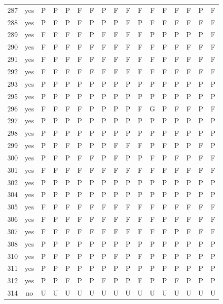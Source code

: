\begin{table}[p]
\begin{tabular*}{\textwidth}{@{\extracolsep{\fill}}rcccccccccccccccc}
287 & yes & P & P & P & F & F & P & F & F & F & F & F & F & F & P & F\\
288 & yes & P & F & P & F & P & P & P & F & P & F & F & F & F & F & F\\
289 & yes & F & F & F & F & P & F & F & F & F & P & P & P & P & P & F\\
290 & yes & F & F & F & F & F & F & F & F & F & F & F & F & F & F & F\\
291 & yes & F & F & F & F & F & F & F & F & F & F & F & F & F & F & F\\
292 & yes & F & F & F & F & F & F & F & F & F & F & F & F & F & F & F\\
293 & yes & P & P & P & P & P & P & P & P & P & P & P & P & P & P & P\\
295 & yes & P & P & P & P & P & P & P & P & P & P & P & P & P & P & P\\
296 & yes & F & F & F & F & P & P & P & P & F & G & P & F & F & P & F\\
297 & yes & P & P & P & P & P & P & P & P & P & P & P & P & P & P & P\\
298 & yes & P & P & P & P & P & P & P & P & P & P & P & F & P & P & P\\
299 & yes & P & P & F & P & P & P & F & F & F & P & F & P & P & F & P\\
300 & yes & P & F & P & F & F & P & F & P & P & F & P & F & P & F & F\\
301 & yes & F & F & F & F & F & F & F & F & F & F & F & F & F & F & F\\
302 & yes & P & P & P & P & P & P & P & P & P & P & P & P & P & P & P\\
304 & yes & P & P & P & P & P & P & P & P & P & P & P & P & P & P & P\\
305 & yes & F & F & F & F & F & F & F & F & F & F & F & F & F & F & F\\
306 & yes & F & F & F & F & F & F & F & F & F & F & F & F & F & F & F\\
307 & yes & F & F & F & F & F & F & F & F & F & F & F & P & F & F & F\\
308 & yes & P & P & P & P & P & P & P & P & P & P & P & P & P & P & P\\
310 & yes & P & F & P & P & P & P & F & P & F & P & P & P & P & P & P\\
311 & yes & P & P & P & P & P & P & P & P & P & P & P & P & P & P & P\\
312 & yes & P & P & F & P & P & F & P & P & F & P & P & F & P & P & P\\
314 & no & U & U & U & U & U & U & U & U & U & U & U & U & U & U & U\\
\bottomrule\end{tabular*}\end{table}
\clearpage

